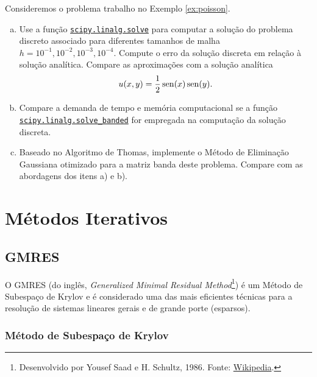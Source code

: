 \begin{exer}
    Consideremos o problema trabalho no Exemplo \ref{ex:poisson}.
    \begin{enumerate}[a)]
    \item Use a função \href{https://docs.scipy.org/doc/scipy/reference/generated/scipy.linalg.solve.html}{\lstinline+scipy.linalg.solve+} para computar a solução do problema discreto associado para diferentes tamanhos de malha $h = 10^{-1}, 10^{-2}, 10^{-3}, 10^{-4}$. Compute o erro da solução discreta em relação à solução analítica. Compare as aproximações com a solução analítica
      \begin{equation}
        u(x,y) = \frac{1}{2}\operatorname{sen}(x)\operatorname{sen}(y).
      \end{equation}
    \item Compare a demanda de tempo e memória computacional se a função \href{https://docs.scipy.org/doc/scipy/reference/generated/scipy.linalg.solve_banded.html}{\lstinline+scipy.linalg.solve_banded+} for empregada na computação da solução discreta.
    \item Baseado no Algoritmo de Thomas, implemente o Método de Eliminação Gaussiana otimizado para a matriz banda deste problema. Compare com as abordagens dos itens a) e b).
    \end{enumerate}
\end{exer}


\section{Métodos Iterativos}\label{cap_sislin_sec_metiter}

\subsection{GMRES}

O GMRES (do inglês, {\it Generalized Minimal Residual Method}\footnote{Desenvolvido por Yousef Saad e H. Schultz, 1986. Fonte: \href{https://en.wikipedia.org/wiki/Generalized_minimal_residual_method}{Wikipedia}.}) é um Método de Subespaço de Krylov e é considerado uma das mais eficientes técnicas para a resolução de sistemas lineares gerais e de grande porte (esparsos).

\subsubsection{Método de Subespaço de Krylov}

